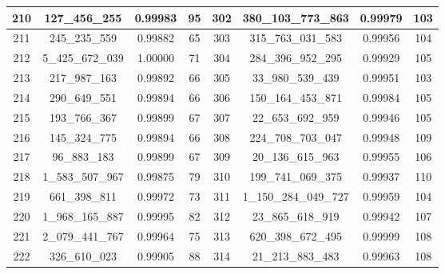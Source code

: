 \documentclass[letterpaper]{article}
\begin{document}
{\begin{tabular}{|c c c c| c c c c|}
        \hline
        210             & 127\_456\_255     & 0.99983          & 95              & 302          & 380\_103\_773\_863    & 0.99979          & 103             \\
        \hline
        211             & 245\_235\_559     & 0.99882          & 65              & 303          & 315\_763\_031\_583    & 0.99956          & 104             \\
        \hline
        212             & 5\_425\_672\_039  & 1.00000          & 71              & 304          & 284\_396\_952\_295    & 0.99929          & 105             \\
        \hline
        213             & 217\_987\_163     & 0.99892          & 66              & 305          & 33\_980\_539\_439     & 0.99951          & 103             \\
        \hline
        214             & 290\_649\_551     & 0.99894          & 66              & 306          & 150\_164\_453\_871    & 0.99984          & 105             \\
        \hline
        215             & 193\_766\_367     & 0.99899          & 67              & 307          & 22\_653\_692\_959     & 0.99946          & 105             \\
        \hline
        216             & 145\_324\_775     & 0.99894          & 66              & 308          & 224\_708\_703\_047    & 0.99948          & 109             \\
        \hline
        217             & 96\_883\_183      & 0.99899          & 67              & 309          & 20\_136\_615\_963     & 0.99955          & 106             \\
        \hline
        218             & 1\_583\_507\_967  & 0.99875          & 79              & 310          & 199\_741\_069\_375    & 0.99937          & 110             \\
        \hline
        219             & 661\_398\_811     & 0.99972          & 73              & 311          & 1\_150\_284\_049\_727 & 0.99959          & 104             \\
        \hline
        220             & 1\_968\_165\_887  & 0.99995          & 82              & 312          & 23\_865\_618\_919     & 0.99942          & 107             \\
        \hline
        221             & 2\_079\_441\_767  & 0.99964          & 75              & 313          & 620\_398\_672\_495    & 0.99999          & 108             \\
        \hline
        222             & 326\_610\_023     & 0.99905          & 88              & 314          & 21\_213\_883\_483     & 0.99963          & 108             \\

\end{tabular}}
\end{document}
